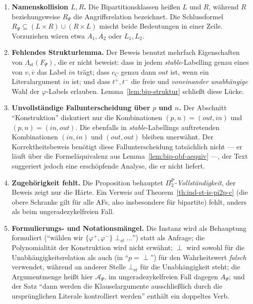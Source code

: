 \begin{enumerate}
{    Einschränkung von \(\lambda_2\) auf \(B\) kombiniert} verwendet zwei nie
    eingeführte Symbole. Erschwerend kommt hinzu, dass \(A\) in der gesamten
    Arbeit die Argumentmenge eines AFs bezeichnet; gemeint sind offenbar
    \(\{\varphi^{+},\varphi^{-}\}\) und \(X\cup\{p,n\}\).
    \item \textbf{Namenskollision \(L,R\).} Die Bipartitionsklassen heißen
    \(L\) und \(R\), während \(R\) beziehungsweise \(R_\Psi\) die
    Angriffsrelation bezeichnet. Die Schlussformel
    \(R_\Psi\subseteq(L\times R)\cup(R\times L)\) mischt beide Bedeutungen in
    einer Zeile. Vorzuziehen wären etwa \(A_1,A_2\) oder \(L_1,L_2\).
    \item \textbf{Fehlendes Strukturlemma.} Der Beweis benutzt mehrfach
    Eigenschaften von \(\Lambda_{\mathrm{st}}(F_\Psi)\), die er nicht beweist:
    dass in jedem \textit{stable}-Labelling genau eines von \(v,\overline{v}\)
    das Label \(\mathit{in}\) trägt; dass \(c_C\) genau dann \(\mathit{out}\)
    ist, wenn ein Literalargument \(\mathit{in}\) ist; und dass \(t^{+},t^{-}\)
    die freie und \emph{voneinander unabhängige} Wahl der \(\varphi\)-Labels
    erlauben. Lemma~\ref{lem:bip-struktur} schließt diese Lücke.
    \item \textbf{Unvollständige Fallunterscheidung über \(p\) und \(n\).} Der
    Abschnitt \enquote{Konstruktion} diskutiert nur die Kombinationen
    \((p,n)=(\mathit{out},\mathit{in})\) und
    \((p,n)=(\mathit{in},\mathit{out})\). Die ebenfalls in
    \textit{stable}-Labellings auftretenden Kombinationen
    \((\mathit{in},\mathit{in})\) und \((\mathit{out},\mathit{out})\) bleiben
    unerwähnt. Der Korrektheitsbeweis benötigt diese Fallunterscheidung
    tatsächlich nicht --- er läuft über die Formeläquivalenz aus
    Lemma~\ref{lem:bip-qbf-aequiv} ---, der Text suggeriert jedoch eine
    erschöpfende Analyse, die er nicht liefert.
    \item \textbf{Zugehörigkeit fehlt.} Die Proposition behauptet
    \(\Pi_2^\text{P}\)-\emph{Vollständigkeit}, der Beweis zeigt nur die Härte.
    Ein Verweis auf Theorem~\ref{th:ind-st-is-pi2p-c} (die obere Schranke gilt
    für alle AFs, also insbesondere für bipartite) fehlt, anders als beim
    ungeradezykelfreien Fall.
    \item \textbf{Formulierungs- und Notationsmängel.} Die Instanz wird als
    Behauptung formuliert (\enquote{wählen wir
    \(\{\varphi^{+},\varphi^{-}\}\perp_{st}\ldots\)}) statt als Anfrage; die
    Polynomialität der Konstruktion wird nicht erwähnt; \(\perp\) wird sowohl
    für die Unabhängigkeitsrelation als auch (in \enquote{\(p=\perp\)}) für den
    Wahrheitswert \emph{falsch} verwendet, während an anderer Stelle
    \(\bot_{\mathrm{st}}\) für die Unabhängigkeit steht; die Argumentmenge
    heißt hier \(\mathcal{A}_\Psi\), im ungeradezykelfreien Fall dagegen
    \(A_\Psi\); und der Satz \enquote{dann werden die Klauselargumente
    ausschließlich durch die ursprünglichen Literale kontrolliert werden}
    enthält ein doppeltes Verb.
\end{enumerate}

